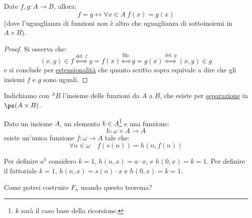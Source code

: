 \documentclass[11pt]{scrartcl}
\begin{document}
\begin{remark}
	Date $f,g : A \rightarrow B$, allora:
	\[ f = g \leftrightarrow \forall x \in A \; f(x) = g(x)
		\]
	(dove l'uguaglianza di funzioni non è altro che uguaglianza di sottoinsiemi in $A \times B$).
\end{remark}

\begin{proof}
	Si osserva che:
	\[ (x,y) \in f \overset{\text{def. $f$}}{\iff} y = f(x) \overset{\text{Hp.}}{\iff} y = g(x) \overset{\text{def. $g$}}{\iff} (x,y) \in g
		\]
	e si conclude per \hyperref[ax2]{estensionalità} che quanto scritto sopra equivale a dire che gli insiemi $f$ e $g$ sono uguali.
\end{proof}

\begin{notation}
	Indichiamo con ${}^{A}B$ l'insieme delle funzioni da $A$ a $B$, che esiste per \hyperref[ax3]{separazione} in $\ps(A \times B)$.
\end{notation}

\begin{theorem}
	\label{ric1}
	Dato un insieme $A$, un elemento $k \in A$\footnote{$k$ sarà il caso base della ricorsione.} e una funzione:
	\[ h : \omega \times A \longrightarrow A
		\]
	esiste un'unica funzione $f : \omega \rightarrow A$ tale che:
	\[ \forall n \in \omega \quad f(s(n)) = h(n,f(n))
		\]
\end{theorem}

\begin{example}
	Per definire $a^b$ considero $k = 1$, $h(n,x) = a \cdot x$, e $h(0,x) = k = 1$. Per definire il fattoriale $k = 1$, $h(n,x) = s(n) \cdot x$ e $h(0,x) = k = 1$.
\end{example}

\begin{exercise}
	Come potrei costruire $F_n$ usando questo teorema?
\end{exercise}
\end{document}
